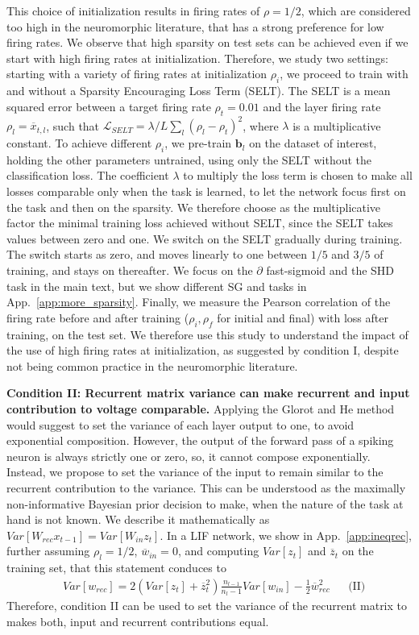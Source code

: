 This choice of initialization results in firing rates of $\rho=1/2$, which are considered too high in the neuromorphic literature, that has a strong preference for low firing rates. We observe that high sparsity on test sets can be achieved even if we start with high firing rates at initialization. Therefore, we study two settings: starting with a variety of firing rates at initialization $\rho_i$, we proceed to train with and without a Sparsity Encouraging Loss Term (SELT).
The SELT is a mean squared error between a target firing rate $\rho_t=0.01$ and the layer firing rate $\rho_l=\overline{x}_{t,l}$, such that $\mathcal{L}_{SELT} = \lambda/L\sum_l(\rho_l-\rho_t)^2$, where $\lambda$ is a multiplicative constant. 
To achieve different $\rho_i$, we pre-train $\boldsymbol{b}_l$ on the dataset of interest, holding the other parameters untrained, using only the SELT without the classification loss. 
The coefficient $\lambda$ to multiply the loss term is chosen to make all losses comparable only when the task is learned, to let the network focus first on the task and then on the sparsity. We therefore choose as the multiplicative factor the minimal training loss achieved without SELT, since the SELT takes values between zero and one. We switch on the SELT gradually during training. The switch starts as zero, and moves linearly to one between $1/5$ and $3/5$ of training, and stays on thereafter. We focus on the $\partial$ fast-sigmoid and the SHD task in the main text, but we show different SG and tasks in App.~\ref{app:more_sparsity}.
Finally, we measure the Pearson correlation of the firing rate before and after training ($\rho_i, \rho_f$ for initial and final) with loss after training, on the test set. We therefore use this study to understand the impact of the use of high firing rates at initialization, as suggested by condition I, despite not being common practice in the neuromorphic literature.

\noindent\textbf{Condition II: Recurrent matrix variance can  make recurrent and input contribution to voltage comparable.}
Applying the Glorot and He method would suggest to set the variance of each layer output to one, to avoid exponential composition. However, the output of the forward pass of a spiking neuron is always strictly one or zero, so, it cannot compose exponentially. Instead, we propose to set the variance of the input to remain similar to the recurrent contribution to the variance. This can be understood as the maximally non-informative Bayesian prior decision to make, when the nature of the task at hand is not known. We describe it mathematically as $Var[W_{rec}x_{t-1}] = Var[W_{in}z_t]$. In a LIF network, we show in App.~\ref{app:ineqrec}, further assuming $\rho_l =1/2$,  $\overline{w}_{in}=0$, and computing $Var[z_t]$ and $\overline{z}_t$ on the training set, that this statement conduces to
{\small
\begin{align*}
    &Var[w_{rec}] =  2(Var[z_t] + \overline{z}_t^2)\frac{n_{l-1}}{n_{l}-1}Var[w_{in}] - \frac{1}{2}\overline{w}_{rec}^2 && \text{(II)}
\end{align*}
}
Therefore, condition II can be  used to set the variance of the recurrent matrix to makes both, input and recurrent contributions equal.

